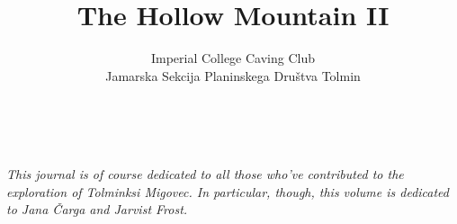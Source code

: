 \documentclass[symmetric, a4paper]{tufte-book} %
\title{The Hollow Mountain II}
\author{Imperial College Caving Club \\ Jamarska Sekcija Planinskega Dru\v{s}tva Tolmin }
\begin{document}
\frontmatter 
\maketitle %
\justify

\cleardoublepage
~\vfill
\begin{doublespace}
\noindent\fontsize{12}{14}\selectfont\sffamily\slshape
\nohyphenation
This journal is of course dedicated to all those who've contributed to the exploration of Tolminksi Migovec. In particular, though, this volume is dedicated to Jana Čarga and Jarvist Frost.
%
\end{doublespace}
\vfill
\vfill


\newpage


\tableofcontents 


\mainmatter

%
%
%
%
%








\backmatter
% 	
%         	
 	
% 	
	
	
	\listofsurveys
	\listofmaps

    \passage[|see{}]{}
    \printindex
   	
    

    
\end{document}
